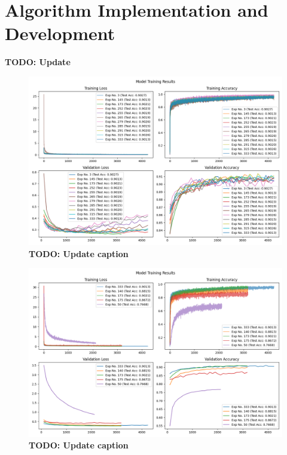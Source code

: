 \documentclass[11pt]{amsart}
\begin{document}
\section{Algorithm Implementation and Development}\label{sec:algorithms}
\textbf{TODO: Update}

\begin{figure}[h]
	\centering
	\includegraphics[width=.9\textwidth]{../visualizations/model_training_results_vis.png}
 	\caption{\textbf{TODO: Update caption}}\label{fig:f0}
\end{figure}

\begin{figure}[h]
	\centering
	\includegraphics[width=.9\textwidth]{../visualizations/model_training_results_vis_0.png}
 	\caption{\textbf{TODO: Update caption}}\label{fig:f1}
\end{figure}
\end{document}
